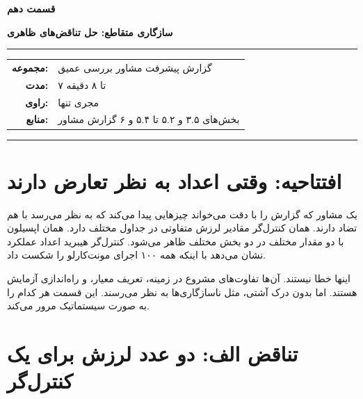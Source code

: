 \documentclass[12pt, a4paper]{article}
\newcommand{\dash}{\lr{---}}
\begin{document}

\thispagestyle{empty}

\vspace*{1.2cm}

{\centering
{\color{seriesblue}\fontsize{24}{30}\selectfont\bfseries قسمت دهم}

\vspace{0.5cm}
{\fontsize{15}{20}\selectfont\bfseries سازگاری متقاطع: حل تناقض‌های ظاهری}

\vspace{0.9cm}
{\color{seriesblue}\rule{0.55\linewidth}{1pt}}
\vspace{0.7cm}

{\normalsize
\begin{tabular}{rl}
  \textbf{مجموعه:}     & گزارش پيشرفت مشاور \dash{} بررسی عمیق \\[5pt]
  \textbf{مدت:}        & ۷ تا ۸ دقیقه \\[5pt]
  \textbf{راوی:}       & مجری تنها \\[5pt]
  \textbf{منابع:}      & بخش‌های ۳.۵ و ۵.۲ تا ۵.۴ و ۶ گزارش مشاور \\
\end{tabular}
}

\vspace{0.9cm}
{\color{seriesblue}\rule{0.55\linewidth}{0.4pt}}
\par}

\vspace{1.2cm}

\section{افتتاحیه: وقتی اعداد به نظر تعارض دارند}

يک مشاور که گزارش را با دقت می‌خواند چيزهايی پيدا می‌کند که به نظر می‌رسد با هم تضاد دارند. همان کنترل‌گر مقادير لرزش متفاوتی در جداول مختلف دارد. همان اپسيلون با دو مقدار مختلف در دو بخش مختلف ظاهر می‌شود. کنترل‌گر هيبريد اعداد عملکرد نشان می‌دهد با اينکه همه ۱۰۰ اجرای مونت‌کارلو را شکست داد.

اينها خطا نيستند. آن‌ها تفاوت‌های مشروع در زمينه، تعريف معيار، و راه‌اندازی آزمايش هستند. اما بدون درک آشتی، مثل ناسازگاری‌ها به نظر می‌رسند. اين قسمت هر کدام را به صورت سيستماتيک مرور می‌کند.

\section{تناقض الف: دو عدد لرزش برای يک کنترل‌گر}
\end{document}
